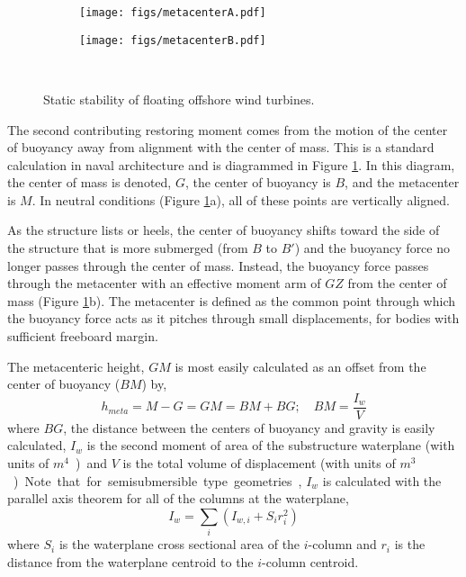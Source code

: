 \begin{figure}[htb]
  \begin{subfigure}[b]{0.49\linewidth}
    \centering \texttt{[image: figs/metacenterA.pdf]}
    \caption{}
  \end{subfigure}
  \begin{subfigure}[b]{0.49\linewidth}
    \centering \texttt{[image: figs/metacenterB.pdf]}
    \caption{}
  \end{subfigure}\\
  \caption{Static stability of floating offshore wind turbines.}
  \label{fig:metacenter}
\end{figure}

The second contributing restoring moment comes from the motion of the
center of buoyancy away from alignment with the center of mass.  This is
a standard calculation in naval architecture \citep{thiagarajan2014} and is
diagrammed in Figure \ref{fig:metacenter}.  In this diagram, the center
of mass is denoted, $G$, the center of buoyancy is $B$, and the
metacenter is $M$.  In neutral conditions (Figure \ref{fig:metacenter}a),
all of these points are vertically aligned.

As the structure lists or heels, the center of buoyancy shifts toward
the side of the structure that is more submerged (from $B$ to $B'$) and
the buoyancy force no longer passes through the center of mass.
Instead, the buoyancy force passes through the metacenter with an
effective moment arm of $GZ$ from the center of mass (Figure
\ref{fig:metacenter}b).  The metacenter is defined as the common point
through which the buoyancy force acts as it pitches through small
displacements, for bodies with sufficient freeboard margin.

The metacenteric height, $GM$ is most easily calculated as an offset from the
center of buoyancy ($BM$) by,
\begin{equation}
  h_{meta} = M - G = GM = BM + BG;\quad BM = \frac{I_w}{V}
\end{equation}
where $BG$, the distance between the centers of buoyancy and gravity is
easily calculated, $I_w$ is the second moment of area of the substructure waterplane
(with units of \unit{$m^4$}) and $V$ is the total volume of displacement
(with units of \unit{$m^3$}).  Note that for semisubmersible type
geometries, $I_w$ is calculated with the parallel axis theorem for all
of the columns at the waterplane,
\begin{equation}
  I_w = \sum_i \left( I_{w,i} + S_ir_i^2 \right)
\end{equation}
where $S_i$ is the waterplane cross sectional area of the $i$-\th column and $r_i$
is the distance from the waterplane centroid to the $i$-\th column centroid.

